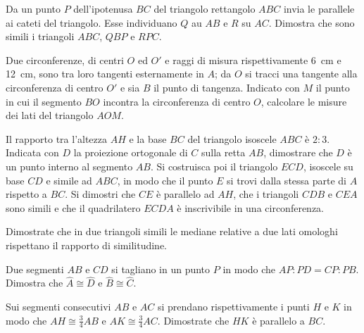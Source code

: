 \begin{multicols}{2}
\begin{esercizio}
\label{ese:6.71}
Da un punto $P$ dell'ipotenusa $BC$ del triangolo rettangolo $ABC$ 
invia le parallele ai cateti del triangolo. Esse individuano $Q$ au 
$AB$ e $R$ su $AC$. Dimostra che sono simili i triangoli $ABC$, $QBP$ 
e $RPC$.
\end{esercizio}

\begin{esercizio}
\label{ese:6.72}
Due circonferenze, di centri $O$ ed $O'$ e raggi di misura 
rispettivamente 6~cm e 12~cm, sono tra loro tangenti esternamente in 
$A$; da $O$ si tracci una tangente alla circonferenza di centro $O'$ 
e sia $B$ il punto di tangenza. Indicato con $M$ il punto in cui il 
segmento $BO$ incontra la circonferenza di centro $O$, calcolare le 
misure dei lati del triangolo $AOM$.
\end{esercizio}

\begin{esercizio}
\label{ese:6.73}
Il rapporto tra l'altezza $AH$ e la base $BC$ del triangolo isoscele 
$ABC$ è $2:3$. Indicata con $D$ la proiezione ortogonale di $C$ sulla 
retta $AB$, dimostrare che $D$ è un punto interno al segmento $AB$. 
Si costruisca poi il triangolo $ECD$, isoscele su base $CD$ e simile 
ad $ABC$, in modo che il punto $E$ si trovi dalla stessa parte di $A$ 
rispetto a $BC$. Si dimostri che $CE$ è parallelo ad $AH$, che i 
triangoli $CDB$ e $CEA$ sono simili e che il quadrilatero $ECDA$ è 
inscrivibile in una circonferenza.
\end{esercizio}

\begin{esercizio}
\label{ese:6.74}
Dimostrate che in due triangoli simili le mediane relative a due lati 
omologhi rispettano il rapporto di similitudine.
\end{esercizio}

\begin{esercizio}
\label{ese:6.75}
Due segmenti $AB$ e $CD$ si tagliano in un punto $P$ in modo che 
$AP:PD=CP:PB$. Dimostra che $\widehat{A}\cong \widehat{D}$ e 
$\widehat{B}\cong \widehat{C}$.
\end{esercizio}

\begin{esercizio}
\label{ese:6.76}
Sui segmenti consecutivi $AB$ e $AC$ si prendano rispettivamente i 
punti $H$ e $K$ in modo che $AH\cong \frac{3}{4}AB$ e $AK\cong 
\frac{3}{4}AC$. Dimostrate che $HK$ è parallelo a $BC$.
\end{esercizio}


\end{multicols}
